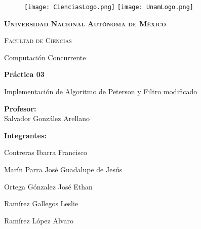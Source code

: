 \thispagestyle{empty}

\begin{figure}[ht]
        \texttt{[image: CienciasLogo.png]}
        \label{escudoFI}
    \endminipage
        \texttt{[image: UnamLogo.png]}
        \label{EscuoUNAM}
    \endminipage
\end{figure}

\vspace{0.1cm}

\begin{center}
    {\scshape\LARGE \textbf{Universidad Nacional Autónoma de México} \par}
    {\scshape\Large Facultad de Ciencias\par}

    \begin{center}

        {\LARGE Computación Concurrente\\}
        {\LARGE\bfseries Práctica 03\par}
        \vspace{2mm}
        Implementación de Algoritmo de Peterson y Filtro modificado
        \vspace{1cm}

        \LARGE{\textbf{Profesor:}}\\
        \vspace{2mm}
        \large{Salvador González Arellano}

        \vspace{5mm}
            
        \LARGE  { \textbf{Integrantes:}}\\

        \vspace{5mm}

        \normalsize{Contreras Ibarra Francisco}

        \vspace{3mm}

        \normalsize{Mar\'in Parra Jos\'e Guadalupe de Jes\'us}

        \vspace{3mm}

        \normalsize{Ortega Gónzalez José Ethan}

        \vspace{3mm}

        \normalsize{Ramírez Gallegos Leslie}

        \vspace{3mm}

        \normalsize{Ramírez López Alvaro}

    \end{center}
    
\end{center}
